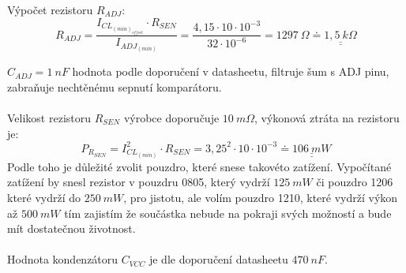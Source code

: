Výpočet rezistoru $R_{ADJ}$:
\begin{equation}
R_{ADJ} = \dfrac{I_{CL_{(min)_{offset}}} \cdot R_{SEN}}{I_{ADJ_{(min)}}} = \dfrac{4,15 \cdot 10 \cdot 10^{-3}}{32 \cdot 10^{-6}} = 1297~\Omega \doteq \underline{\underline{1,5~k\Omega}}
\nonumber
\end{equation}

$C_{ADJ} = 1~nF$ hodnota podle doporučení v datasheetu, filtruje šum s ADJ pinu, zabraňuje nechtěnému sepnutí komparátoru.
\\\\
\indent Velikost rezistoru $R_{SEN}$ výrobce doporučuje $10~m\Omega$, výkonová ztráta na rezistoru je:
\begin{equation}
P_{R_{SEN}} = I_{CL_{(min)}}^2 \cdot R_{SEN} = 3,25^2 \cdot 10 \cdot 10^{-3} \doteq \underline{\underline{106~mW}}
\nonumber
\end{equation}
Podle toho je důležité zvolit pouzdro, které snese takovéto zatížení. Vypočítané zatížení by snesl rezistor v pouzdru 0805, který vydrží $125~mW$ či pouzdro 1206 které vydrží do $250~mW$, pro jistotu, ale volím pouzdro 1210, které vydrží výkon až $500~mW$ tím zajistím že součástka nebude na pokraji svých možností a bude mít dostatečnou životnost.
\\\\
Hodnota kondenzátoru $C_{VCC}$ je dle doporučení datasheetu $470~nF$.